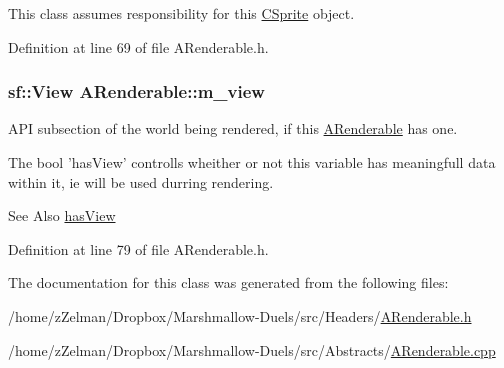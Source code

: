 This class assumes responsibility for this \hyperlink{classCSprite}{C\-Sprite} object. 



Definition at line 69 of file A\-Renderable.\-h.

\hypertarget{classARenderable_a9385344aed3d507e828e5b20c8846f4a}{
\subsubsection[{m\-\_\-view}]{\setlength{\rightskip}{0pt plus 5cm}sf\-::\-View A\-Renderable\-::m\-\_\-view\hspace{0.3cm}{\ttfamily [protected]}}}\label{classARenderable_a9385344aed3d507e828e5b20c8846f4a}


A\-P\-I subsection of the world being rendered, if this \hyperlink{classARenderable}{A\-Renderable} has one. 

The bool 'has\-View' controlls wheither or not this variable has meaningfull data within it, ie will be used durring rendering.

\begin{DoxySeeAlso}{See Also}
\hyperlink{classARenderable_a7975927d5e1b3cffb6b51b8e058fcb51}{has\-View} 
\end{DoxySeeAlso}


Definition at line 79 of file A\-Renderable.\-h.



The documentation for this class was generated from the following files\-:\begin{DoxyCompactItemize}
\item 
/home/z\-Zelman/\-Dropbox/\-Marshmallow-\/\-Duels/src/\-Headers/\hyperlink{ARenderable_8h}{A\-Renderable.\-h}\item 
/home/z\-Zelman/\-Dropbox/\-Marshmallow-\/\-Duels/src/\-Abstracts/\hyperlink{ARenderable_8cpp}{A\-Renderable.\-cpp}\end{DoxyCompactItemize}
